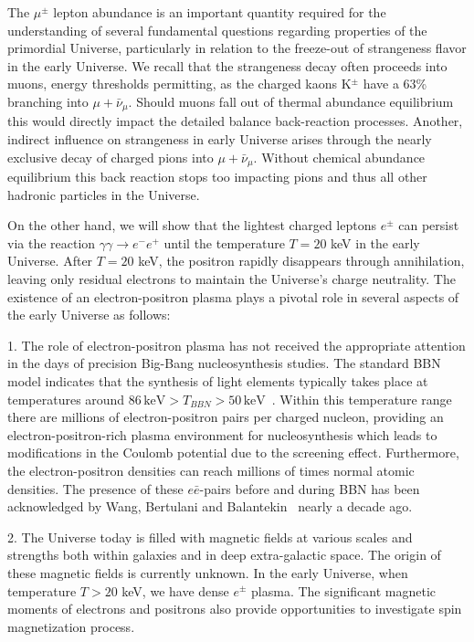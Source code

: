 The $\mu^\pm$ lepton abundance is an important quantity required for the understanding of several fundamental questions regarding properties of the primordial Universe,  particularly in relation to the freeze-out of strangeness flavor in the early Universe. We recall that the strangeness decay often proceeds into muons, energy thresholds permitting, as the charged kaons K$^\pm$ have a 63\% branching into $\mu+\bar \nu_\mu$. Should muons fall out of thermal abundance equilibrium this would directly impact the detailed balance back-reaction processes. Another, indirect influence on strangeness in early Universe arises through the nearly exclusive decay of charged pions into $\mu+\bar \nu_\mu$. Without chemical abundance equilibrium this back reaction stops too impacting pions and thus all other hadronic particles in the Universe. 

On the other hand, we will show that the lightest charged leptons $e^\pm$ can persist via the reaction $\gamma\gamma\to e^-e^+$ until the temperature $T=20$ keV in the early Universe.  After $T=20$ keV, the positron rapidly disappears through annihilation, leaving only residual electrons to maintain the Universe's charge neutrality. The existence of an electron-positron plasma plays a pivotal role in several aspects of the early Universe as follows: 

1. The role of electron-positron plasma has not received the appropriate attention in the days of precision Big-Bang nucleosynthesis studies. The standard BBN model indicates that the synthesis of light elements typically takes place at temperatures around  $86\,\mathrm{keV}>T_{BBN}>50\,\mathrm{keV}$~\cite{Pitrou:2018cgg}. Within this temperature range there are millions of electron-positron pairs per charged nucleon, providing an electron-positron-rich plasma environment for nucleosynthesis which leads to modifications in the Coulomb potential due to the screening effect. Furthermore, the electron-positron densities can reach millions of times normal atomic densities. The presence of  these $e\bar e$-pairs before and during BBN has been acknowledged by Wang, Bertulani and Balantekin~\cite{Wang:2010px} nearly a decade ago.

2. The Universe today is filled with magnetic fields at various scales and strengths both within galaxies and in deep extra-galactic space. The origin of these magnetic fields is currently unknown. In the early Universe, when temperature $T>20$ keV, we have dense $e^\pm$ plasma. The significant magnetic moments of electrons and positrons also provide opportunities to investigate spin magnetization process.

